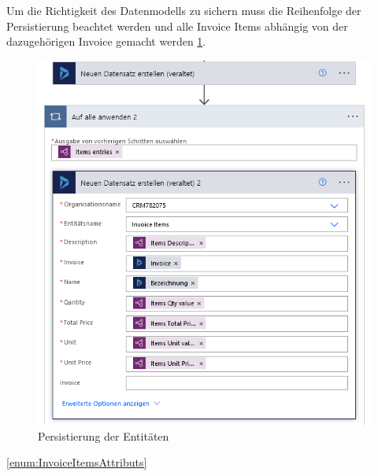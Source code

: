 Um die Richtigkeit des Datenmodells zu sichern muss die Reihenfolge der Persistierung beachtet werden und alle Invoice Items abhängig von der dazugehörigen Invoice gemacht werden \ref{fig:persistence-entities}.

\begin{figure}[h]
    \centering
    \includegraphics[scale=0.9]{sections/cloud-computing/images/power-automate-flow/insert2-dynamics-crm.png}
    \caption{Persistierung der Entitäten}
    \label{fig:persistence-entities}
\end{figure}

\ref{enum:InvoiceItemsAttributs}